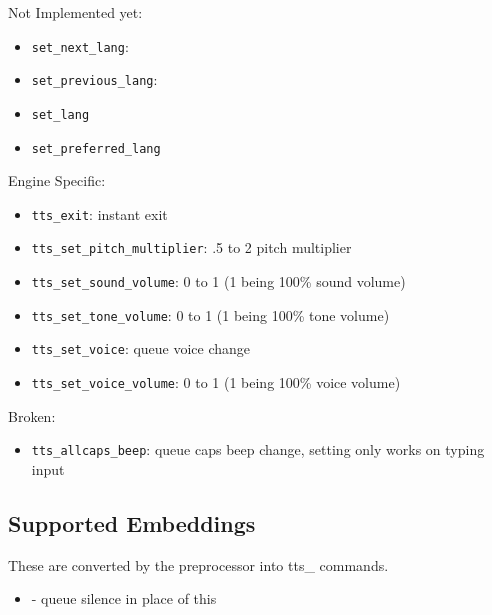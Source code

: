 \documentclass[11pt]{article}
\begin{document}
Not Implemented yet:
\begin{itemize}
\item \texttt{set\_next\_lang}:
\item \texttt{set\_previous\_lang}:
\item \texttt{set\_lang}
\item \texttt{set\_preferred\_lang}
\end{itemize}


Engine Specific:
\begin{itemize}
\item \texttt{tts\_exit}: instant exit
\item \texttt{tts\_set\_pitch\_multiplier}: .5 to 2 pitch multiplier
\item \texttt{tts\_set\_sound\_volume}: 0 to 1 (1 being 100\% sound volume)
\item \texttt{tts\_set\_tone\_volume}: 0 to 1 (1 being 100\% tone volume)
\item \texttt{tts\_set\_voice}: queue voice change
\item \texttt{tts\_set\_voice\_volume}: 0 to 1 (1 being 100\% voice volume)
\end{itemize}

Broken:
\begin{itemize}
\item \texttt{tts\_allcaps\_beep}: queue caps beep change, setting only works on typing
input
\end{itemize}


\subsection{Supported Embeddings}
\label{sec:org6e92d40}

These are converted by the preprocessor into tts\_ commands.

\begin{itemize}
\item\relax [*] - queue silence in place of this
\end{itemize}
\end{document}
